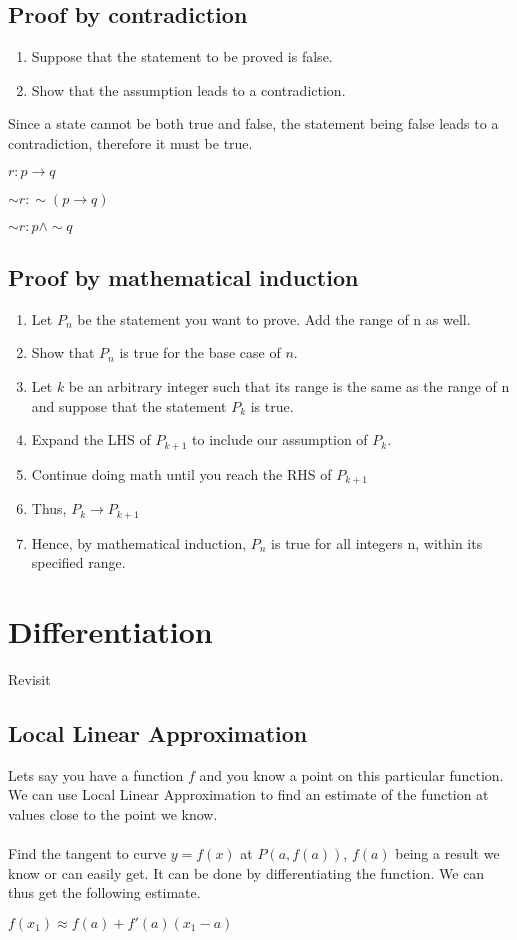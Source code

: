 \documentclass[10pt,a4paper]{article}
\begin{document}
\subsection{Proof by contradiction}
\begin{enumerate}
  \item Suppose that the statement to be proved is false.
  \item Show that the assumption leads to a contradiction.
\end{enumerate}
Since a state cannot be both true and false, the statement being false leads to a contradiction, therefore it must be true. 
\begin{center}
$r : p \rightarrow q$
\end{center}
\begin{center}
$\sim r : \sim (p \rightarrow q)$
\end{center}
\begin{center}
$\sim r : p \wedge \sim q$
\end{center}
\subsection{Proof by mathematical induction}
\begin{enumerate}
  \item Let $P_n$ be the statement you want to prove. Add the range of n as well.
  \item Show that $P_n$ is true for the base case of $n$.
  \item Let $k$ be an arbitrary integer such that its range is the same as the range of n and suppose that the statement $P_k$ is true.
  \item Expand the LHS of $P_{k+1}$ to include our assumption of $P_k$.
  \item Continue doing math until you reach the RHS of $P_{k+1}$
  \item Thus, $P_k \rightarrow P_{k+1}$ 
  \item Hence, by mathematical induction, $P_n$ is true for all integers n, within its specified range.  
\end{enumerate}

\section{Differentiation }
Revisit


\subsection{Local Linear Approximation}
Lets say you have a function $f$ and you know a point on this particular function. We can use Local Linear Approximation to find an estimate of the function at values close to the point we know.
\\\\
Find the tangent to curve $y = f(x)$ at $P(a, f(a))$, $f(a)$ being a result we know or can easily get. It can be done by differentiating the function. We can thus get the following estimate.
\begin{center}
$f(x_1)\approx f(a)+f'(a)(x_1-a)$
\end{center}   
\end{document}
